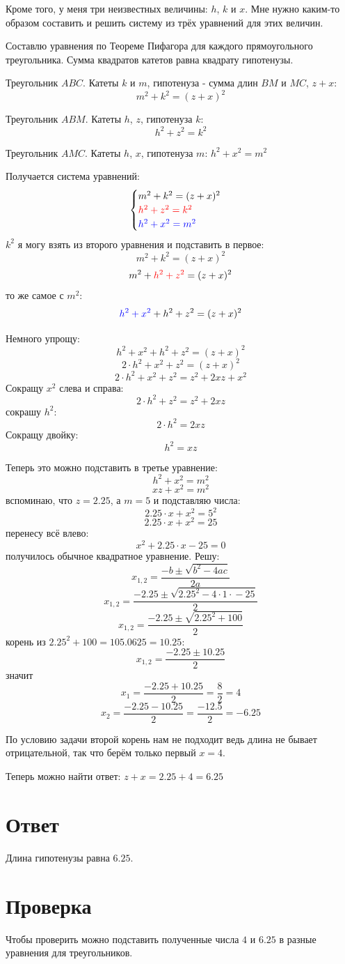 \documentclass{article}
\begin{document}
Кроме того, у меня три неизвестных величины:  $h$, $k$ и $x$. Мне нужно каким-то образом составить и решить систему из трёх уравнений для этих величин.

Составлю уравнения по Теореме Пифагора для каждого прямоугольного треугольника. Сумма квадратов катетов равна квадрату гипотенузы.

Треугольник $ABC$. Катеты $k$ и $m$, гипотенуза - сумма длин $BM$ и $MC$, $z+x$:
$$m^2+k^2=(z+x)^2$$

Треугольник $ABM$. Катеты $h$, $z$, гипотенуза $k$:
$$h^2+z^2=k^2$$

Треугольник $AMC$. Катеты $h$, $x$, гипотенуза $m$:
$h^2+x^2=m^2$

Получается система уравнений:
$$
\begin{cases}
m^2+k^2=(z+x)^2 \\
{\color{red}h^2+z^2=k^2} \\
{\color{blue}h^2+x^2=m^2}
\end{cases}
$$
$k^2$ я могу взять из второго уравнения и подставить в первое:
$$m^2+k^2=(z+x)^2$$
$$m^2+{\color{red}h^2+z^2}=(z+x)^2$$
то же самое с $m^2$:
$${\color{blue}h^2+x^2}+h^2+z^2=(z+x)^2$$

Немного упрощу:
$$h^2+x^2+h^2+z^2=(z+x)^2$$
$$2\cdot{}h^2+x^2+z^2=(z+x)^2$$
$$2\cdot{}h^2+x^2+z^2=z^2+2xz+x^2$$
Сокращу $x^2$ слева и справа:
$$2\cdot{}h^2+z^2=z^2+2xz$$
сокрашу $h^2$:
$$2\cdot{}h^2=2xz$$
Сокращу двойку:
$$h^2=xz$$

Теперь это можно подставить в третье уравнение:
$$h^2+x^2=m^2$$
$$xz+x^2=m^2$$
вспоминаю, что $z=2.25$, а $m=5$ и подставляю числа:
$$2.25\cdot{}x+x^2=5^2$$
$$2.25\cdot{}x+x^2=25$$
перенесу всё влево:
$$x^2+2.25\cdot{}x-25=0$$
получилось обычное квадратное уравнение.
Решу:
$$x_{1,2}=\frac{-b\pm\sqrt{b^2-4ac}}{2a}$$
$$x_{1,2}=\frac{-2.25\pm\sqrt{2.25^2-4\cdot{}1\cdot{}-25}}{2}$$
$$x_{1,2}=\frac{-2.25\pm\sqrt{2.25^2+100}}{2}$$
корень из $2.25^2+100=105.0625=10.25$:
$$x_{1,2}=\frac{-2.25\pm10.25}{2}$$
значит
$$x_1=\frac{-2.25+10.25}{2}=\frac{8}{2}=4$$
$$x_2=\frac{-2.25-10.25}{2}=\frac{-12.5}{2}=-6.25$$

По условию задачи второй корень нам не подходит ведь длина не бывает отрицательной, так что берём только первый $x=4$.

Теперь можно найти ответ: $z+x=2.25+4=6.25$

\section{Ответ}
Длина гипотенузы равна $6.25$.

\section{Проверка}
Чтобы проверить можно подставить полученные числа $4$ и $6.25$  в разные уравнения для треугольников.
\end{document}
